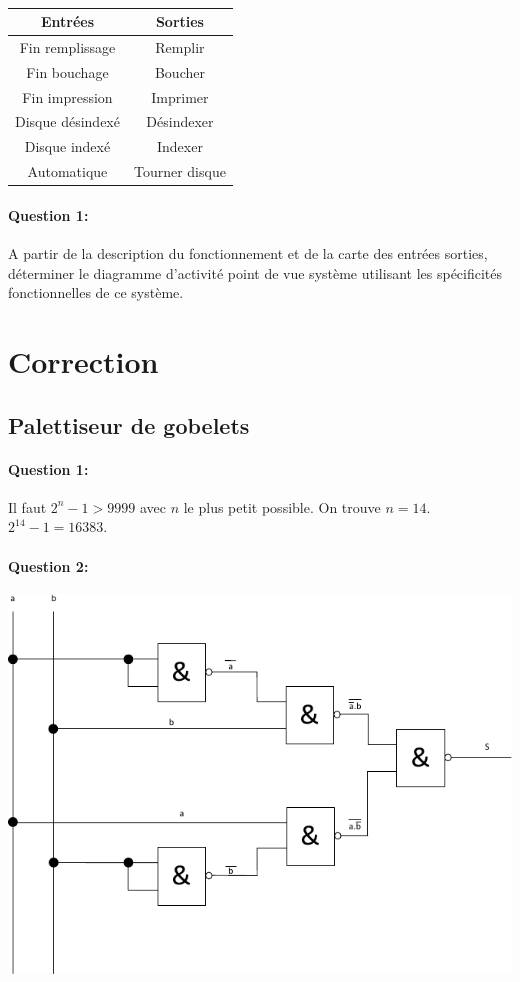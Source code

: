 ~\

\begin{center}
\begin{tabular}{|c|c|}
\hline
\textbf{Entrées} & \textbf{Sorties} \\
\hline
Fin remplissage & Remplir \\
\hline
Fin bouchage & Boucher \\
\hline
Fin impression & Imprimer \\
\hline
Disque désindexé & Désindexer \\
\hline
Disque indexé & Indexer \\
\hline
Automatique & Tourner disque \\
\hline
\end{tabular} 
\end{center}
 
\paragraph{Question 1:} A partir de la description du fonctionnement et de la carte des entrées sorties, déterminer le diagramme d'activité point de vue système utilisant les spécificités fonctionnelles de ce système. 
 

\clearpage

\ifdef{\public}{}{}

\pagestyle{correction}

\newpage

\section{Correction}

\subsection{Palettiseur de gobelets}

\paragraph{Question 1:} Il faut $2^n-1>9999$ avec $n$ le plus petit possible. On trouve $n=14$. $2^14-1=16383$.

\paragraph{Question 2:}

\begin{center}
 \includegraphics[width=0.7\linewidth]{img/nands}
\end{center}

